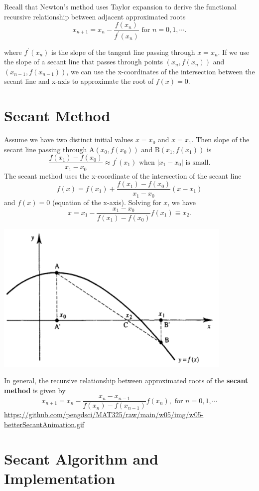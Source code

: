 \documentclass[
]{book}
\begin{document}
Recall that Newton's method uses Taylor expansion to derive the functional recursive relationship between adjacent approximated roots
\[
x_{n+1} = x_n - \frac{f(x_n)}{f^\prime(x_n)} \text{ for }n = 0, 1, \cdots.
\]

where \(f^\prime(x_n)\) is the slope of the tangent line passing through \(x=x_n\). If we use the slope of a secant line that passes through points \((x_n, f(x_n))\) and \((x_{n-1}, f(x_{n-1}))\), we can use the x-coordinates of the intersection between the secant line and x-axis to approximate the root of \(f(x) = 0\).

\hypertarget{secant-method-1}{%
\section{Secant Method}\label{secant-method-1}}

Assume we have two distinct initial values \(x = x_0\) and \(x = x_1\). Then slope of the secant line passing through A\((x_0, f(x_0))\) and B\((x_1, f(x_1))\) is
\[
\frac{f(x_1)-f(x_0)}{x_1-x_0} \approx f^\prime(x_1) \text{ when } |x_1-x_0| \text{ is small}.
\]
The secant method uses the x-coordinate of the intersection of the secant line
\[
f(x) = f(x_1) + \frac{f(x_1)-f(x_0)}{x_1-x_0}(x - x_1)
\]
and \(f(x) = 0\) (equation of the x-axis). Solving for \(x\), we have
\[
x = x_1 -\frac{x_1-x_0}{f(x_1)-f(x_0)} f(x_1) \equiv x_2.
\]

\begin{center}\includegraphics[width=0.5\linewidth]{img05/w05-secant} \end{center}

In general, the recursive relationship between approximated roots of the \textbf{secant method} is given by
\[
x_{n+1} = x_n -\frac{x_n-x_{n-1}}{f(x_n)-f(x_{n-1})} f(x_n), \text{ for } n =0, 1, \cdots 
\]
\url{https://github.com/pengdsci/MAT325/raw/main/w05/img/w05-betterSecantAnimation.gif}

\hypertarget{secant-algorithm-and-implementation}{%
\section{Secant Algorithm and Implementation}\label{secant-algorithm-and-implementation}}
\end{document}
